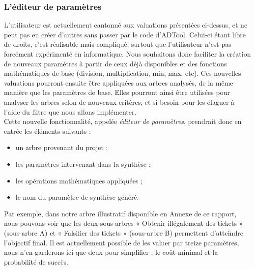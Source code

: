 		\subsubsection{L'éditeur de paramètres}
			\label{subsec::EditParam}

			L'utilisateur est actuellement cantonné aux valuations présentées ci-dessus, et ne peut pas en créer d'autres sans passer par le code d'ADTool. Celui-ci étant libre de droits, c'est réalisable mais compliqué, surtout que l'utilisateur n'est pas forcément expérimenté en informatique. %
			Nous souhaitons donc faciliter la création de nouveaux paramètres à partir de ceux déjà disponibles et des fonctions mathématiques de base (division, multiplication, min, max, etc). Ces nouvelles valuations pourront ensuite être appliquées aux arbres analysés, de la même manière que les paramètres de base. Elles pourront ainsi être utilisées pour analyser les arbres selon de nouveaux critères, et si besoin pour les élaguer à l'aide du filtre que nous allons implémenter.\\

			Cette nouvelle fonctionnalité, appelée \emph{éditeur de paramètres}, prendrait donc en entrée les éléments suivants :
			\begin{itemize}%
				\item un arbre provenant du projet ; %
				\item les paramètres intervenant dans la synthèse ;
				\item les opérations mathématiques appliquées ;
				\item le nom du paramètre de synthèse généré.
			\end{itemize}

			Par exemple, dans notre arbre illustratif disponible en Annexe de ce rapport, nous pouvons voir que les deux sous-arbres « Obtenir illégalement des tickets » (sous-arbre A) et « Falsifier des tickets » (sous-arbre B) permettent d'atteindre l'objectif final. Il est actuellement possible de les valuer par treize paramètres, nous n'en garderons ici que deux pour simplifier : le coût minimal et la probabilité de succès.\\ %

